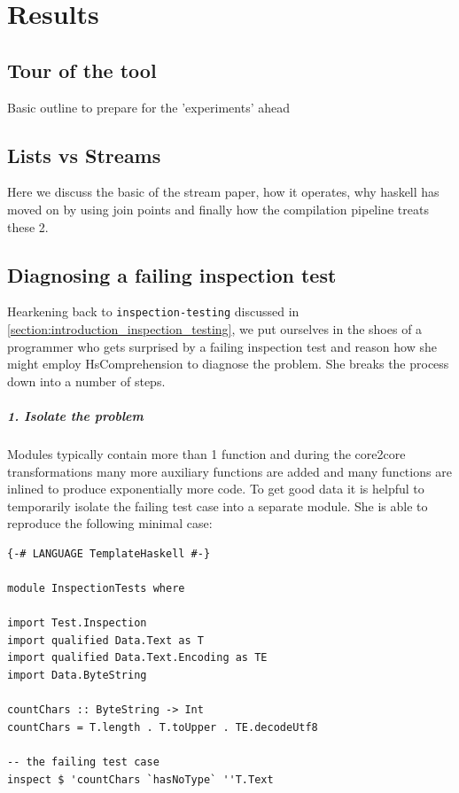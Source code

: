 \documentclass{report}
\newcommand{\mono}{\texttt}
\begin{document}
\chapter{Results}

\section{Tour of the tool}
Basic outline to prepare for the 'experiments' ahead

\section{Lists vs Streams}
Here we discuss the basic of the stream paper, how it operates, why haskell has moved on by using join points and
finally how the compilation pipeline treats these 2.

\section{Diagnosing a failing inspection test}

Hearkening back to \mono{inspection-testing} discussed in \cref{section:introduction_inspection_testing}, we put
ourselves in the shoes of a programmer who gets surprised by a failing inspection test and reason how she might
employ HsComprehension to diagnose the problem. She breaks the process down into a number of steps.

\paragraph{1. Isolate the problem}
Modules typically contain more than 1 function and during the core2core transformations many more auxiliary functions are
added and many functions are inlined to produce exponentially more code. To get good data it is helpful to temporarily isolate the
failing test case into a separate module. She is able to reproduce the following minimal case:


\begin{verbatim}
{-# LANGUAGE TemplateHaskell #-}

module InspectionTests where

import Test.Inspection
import qualified Data.Text as T
import qualified Data.Text.Encoding as TE
import Data.ByteString

countChars :: ByteString -> Int
countChars = T.length . T.toUpper . TE.decodeUtf8

-- the failing test case
inspect $ 'countChars `hasNoType` ''T.Text
\end{verbatim}
\end{document}
